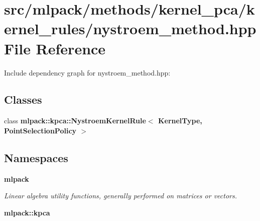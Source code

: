 \section{src/mlpack/methods/kernel\-\_\-pca/kernel\-\_\-rules/nystroem\-\_\-method.hpp File Reference}
\label{kernel__pca_2kernel__rules_2nystroem__method_8hpp}
Include dependency graph for nystroem\-\_\-method.\-hpp\-:
\subsection*{Classes}
\begin{DoxyCompactItemize}
\item 
class {\bf mlpack\-::kpca\-::\-Nystroem\-Kernel\-Rule$<$ Kernel\-Type, Point\-Selection\-Policy $>$}
\end{DoxyCompactItemize}
\subsection*{Namespaces}
\begin{DoxyCompactItemize}
\item 
{\bf mlpack}
\begin{DoxyCompactList}\small\item\em Linear algebra utility functions, generally performed on matrices or vectors. \end{DoxyCompactList}\item 
{\bf mlpack\-::kpca}
\end{DoxyCompactItemize}
